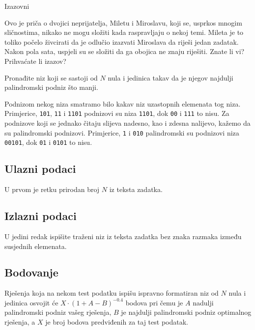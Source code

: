 \begin{statement}[
  problempoints=100,
  timelimit=1 sekunda,
  memorylimit=512 MiB,
]{Izazovni}

Ovo je priča o dvojici neprijatelja, Miletu i Miroslavu, koji se, usprkos
mnogim sličnostima, nikako ne mogu složiti kada raspravljaju o nekoj temi.
Mileta je to toliko počelo živcirati da je odlučio izazvati Miroslava da
riješi jedan zadatak.  Nakon pola sata, uspjeli su se složiti da ga obojica
ne znaju riješiti.  Znate li vi? Prihvaćate li izazov?

Pronađite niz koji se sastoji od $N$ nula i jedinica takav da je njegov najdulji
palindromski podniz što manji.

Podnizom nekog niza smatramo bilo kakav niz uzastopnih elemenata tog niza.
Primjerice, \texttt{101}, \texttt{11} i \texttt{1101} podnizovi su niza
\texttt{1101}, dok \texttt{00} i \texttt{111} to nisu. Za podnizove koji se
jednako čitaju slijeva nadesno, kao i zdesna nalijevo, kažemo da su
palindromski podnizovi. Primjerice, \texttt{1} i \texttt{010} palindromski su
podnizovi niza \texttt{00101}, dok \texttt{01} i \texttt{0101} to nisu.

\subsection*{Ulazni podaci}
U prvom je retku prirodan broj $N$ iz teksta zadatka.

\subsection*{Izlazni podaci}
U jedini redak ispišite traženi niz iz teksta zadatka bez znaka razmaka
između susjednih elemenata.

\subsection*{Bodovanje}
Rješenja koja na nekom test podatku ispišu ispravno formatiran niz od $N$ nula
i jedinica osvojit će $X\cdot(1+A-B)^{-0.4}$ bodova pri čemu je $A$ nadulji
palindromski podniz vašeg rješenja, $B$ je najdulji palindromski podniz
optimalnog rješenja, a $X$ je broj bodova predviđenih za taj test podatak.


\end{statement}

